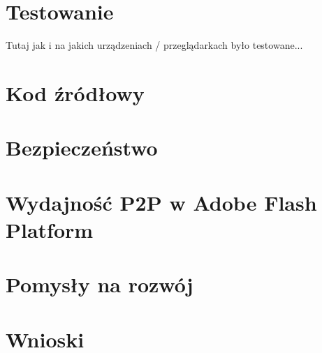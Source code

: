 \section{Testowanie}

Tutaj jak i na jakich urządzeniach / przeglądarkach było testowane...

\section{Kod źródłowy}

\section{Bezpieczeństwo}

\section{Wydajność P2P w Adobe Flash Platform}

\section{Pomysły na rozwój}

\section{Wnioski}


\newpage
